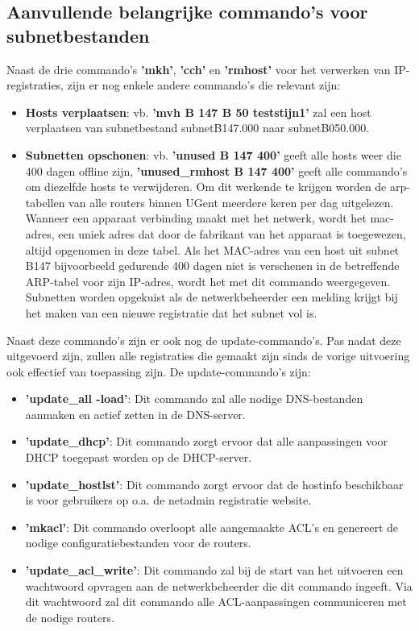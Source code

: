 \subsection{Aanvullende belangrijke commando's voor subnetbestanden}
Naast de drie commando's \textbf{'mkh'}, \textbf{'cch'} en \textbf{'rmhost'} voor het verwerken van IP-registraties, zijn er nog enkele andere commando's die relevant zijn:

\begin{itemize}
    \item \textbf{Hosts verplaatsen}: vb. \textbf{'mvh B 147 B 50 teststijn1'} zal een host verplaatsen van subnetbestand subnetB147.000 naar subnetB050.000.
    \item \textbf{Subnetten opschonen}: vb. \textbf{'unused B 147 400'} geeft alle hosts weer die 400 dagen offline zijn, \textbf{'unused\_rmhost B 147 400'} geeft alle commando's om diezelfde hosts te verwijderen. Om dit werkende te krijgen worden de \acrshort{arp}-tabellen van alle routers binnen UGent meerdere keren per dag uitgelezen. Wanneer een apparaat verbinding maakt met het netwerk, wordt het \acrfull{mac}-adres, een uniek adres dat door de fabrikant van het apparaat is toegewezen, altijd opgenomen in deze tabel. Als het MAC-adres van een host uit subnet B147 bijvoorbeeld gedurende 400 dagen niet is verschenen in de betreffende ARP-tabel voor zijn IP-adres, wordt het met dit commando weergegeven. Subnetten worden opgekuist als de netwerkbeheerder een melding krijgt bij het maken van een nieuwe registratie dat het subnet vol is.
\end{itemize}

Naast deze commando's zijn er ook nog de update-commando's. Pas nadat deze uitgevoerd zijn, zullen alle registraties die gemaakt zijn sinds de vorige uitvoering ook effectief van toepassing zijn. De update-commando's zijn:

\begin{itemize}
    \item \textbf{'update\_all -load'}: Dit commando zal alle nodige DNS-bestanden aanmaken en actief zetten in de DNS-server.
    \item \textbf{'update\_dhcp'}: Dit commando zorgt ervoor dat alle aanpassingen voor DHCP toegepast worden op de DHCP-server.
    \item \textbf{'update\_hostlst'}: Dit commando zorgt ervoor dat de hostinfo beschikbaar is voor gebruikers op o.a. de netadmin registratie website.
    \item \textbf{'mkacl'}: Dit commando overloopt alle aangemaakte ACL's en genereert de nodige configuratiebestanden voor de routers.
    \item \textbf{'update\_acl\_write'}: Dit commando zal bij de start van het uitvoeren een wachtwoord opvragen aan de netwerkbeheerder die dit commando ingeeft. Via dit wachtwoord zal dit commando alle ACL-aanpassingen communiceren met de nodige routers.
\end{itemize}

